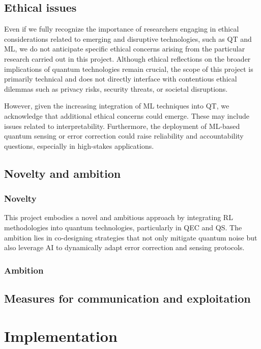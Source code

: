 \documentclass{scrreprt}
\begin{document}
\subsection{Ethical issues}

Even if we fully recognize the importance of researchers engaging in
ethical considerations related to emerging and disruptive
technologies, such as QT and ML, we do not anticipate specific ethical
concerns arising from the particular research carried out in this
project. Although ethical reflections on the broader implications of
quantum technologies remain crucial, the scope of this project is
primarily technical and does not directly interface with contentious
ethical dilemmas such as privacy risks, security threats, or societal
disruptions.

However, given the increasing integration of ML techniques into QT, we
acknowledge that additional ethical concerns could emerge. These may
include issues related to interpretability. Furthermore, the
deployment of ML-based quantum sensing or error correction could raise
reliability and accountability questions, especially in high-stakes
applications.

\subsection{Novelty and ambition}

\subsubsection*{Novelty}

This project embodies a novel and ambitious approach by integrating RL
methodologies into quantum technologies, particularly in QEC and
QS. The ambition lies in co-designing strategies that not only
mitigate quantum noise but also leverage AI to dynamically adapt error
correction and sensing protocols.


\subsubsection*{Ambition}

  
\subsection{Measures for communication and exploitation}



\section{Implementation}
\label{sec:orgccfdc75}
\end{document}
